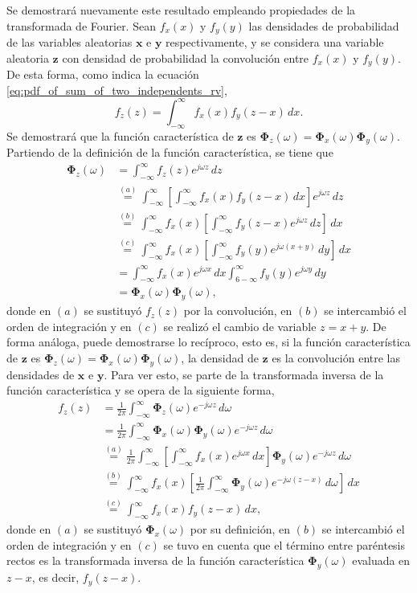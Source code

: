 \documentclass[a4paper]{report}
\newcommand{\x}{\mathbf{x}}
\newcommand{\y}{\mathbf{y}}
\newcommand{\z}{\mathbf{z}}
\newcommand{\Phibf}{\mathbf{\Phi}}
\begin{document}
Se demostrará nuevamente este resultado empleando propiedades de la transformada de Fourier. Sean \(f_x(x)\) y \(f_y(y)\) las densidades de probabilidad de las variables aleatorias \(\x\) e \(\y\) respectivamente, y se considera una variable aleatoria \(\z\) con densidad de probabilidad la convolución entre \(f_x(x)\) y \(f_y(y)\). De esta forma, como indica la ecuación \ref{eq:pdf_of_sum_of_two_independents_rv},
\[
 f_z(z)=\int_{-\infty}^{\infty}f_x(x)f_y(z-x)\,dx.
\]
Se demostrará que la función característica de \(\z\) es \(\Phibf_z(\omega)=\Phibf_x(\omega)\Phibf_y(\omega)\). Partiendo de la definición de la función característica, se tiene que
\begin{align*}
 \Phibf_z(\omega)&=\int_{-\infty}^{\infty}f_z(z)e^{j\omega z}\,dz\\
   &\overset{(a)}{=}\int_{-\infty}^{\infty}\left[\int_{-\infty}^{\infty}f_x(x)f_y(z-x)\,dx\right]e^{j\omega z}\,dz\\
   &\overset{(b)}{=}\int_{-\infty}^{\infty}f_x(x)\left[\int_{-\infty}^{\infty}f_y(z-x)e^{j\omega z}\,dz\right]\,dx\\
   &\overset{(c)}{=}\int_{-\infty}^{\infty}f_x(x)\left[\int_{-\infty}^{\infty}f_y(y)e^{j\omega(x+y)}\,dy\right]\,dx\\
   &=\int_{-\infty}^{\infty}f_x(x)e^{j\omega x}\,dx\int_{6-\infty}^{\infty}f_y(y)e^{j\omega y}\,dy\\
   &=\Phibf_x(\omega)\Phibf_y(\omega),
\end{align*}
donde en \((a)\) se sustituyó \(f_z(z)\) por la convolución, en \((b)\) se intercambió el orden de integración y en \((c)\) se realizó el cambio de variable \(z=x+y\). De forma análoga, puede demostrarse lo recíproco, esto es, si la función característica de \(\z\) es \(\Phibf_z(\omega)=\Phibf_x(\omega)\Phibf_y(\omega)\), la densidad de \(\z\) es la convolución entre las densidades de \(\x\) e \(\y\). Para ver esto, se parte de la transformada inversa de la función característica y se opera de la siguiente forma,
\begin{align*}
 f_z(z)&=\frac{1}{2\pi}\int_{-\infty}^{\infty}\Phibf_z(\omega)e^{-j\omega z}\,d\omega\\
   &=\frac{1}{2\pi}\int_{-\infty}^{\infty}\Phibf_x(\omega)\Phibf_y(\omega)e^{-j\omega z}\,d\omega\\
   &\overset{(a)}{=}\frac{1}{2\pi}\int_{-\infty}^{\infty}\left[\int_{-\infty}^{\infty}f_x(x)e^{j\omega x}\,dx\right]\Phibf_y(\omega)e^{-j\omega z}\,d\omega\\
   &\overset{(b)}{=}\int_{-\infty}^{\infty}f_x(x)\left[\frac{1}{2\pi}\int_{-\infty}^{\infty}\Phibf_y(\omega)e^{-j\omega (z-x)}\,d\omega\right]\,dx\\
   &\overset{(c)}{=}\int_{-\infty}^{\infty}f_x(x)f_y(z-x)\,dx,
\end{align*}
donde en \((a)\) se sustituyó \(\Phibf_x(\omega)\) por su definición, en \((b)\) se intercambió el orden de integración y en \((c)\) se tuvo en cuenta que el término entre paréntesis rectos es la transformada inversa de la función característica \(\Phibf_y(\omega)\) evaluada en \(z-x\), es decir, \(f_y(z-x)\).
\end{document}
